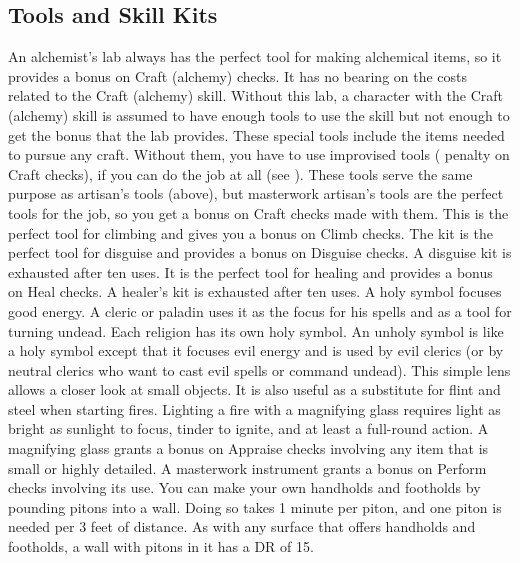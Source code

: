 \subsection{Tools and Skill Kits}
 An alchemist's lab always has the perfect tool for making alchemical items, so it provides a  bonus on Craft (alchemy) checks. It has no bearing on the costs related to the Craft (alchemy) skill. Without this lab, a character with the Craft (alchemy) skill is assumed to have enough tools to use the skill but not enough to get the  bonus that the lab provides.
 These special tools include the items needed to pursue any craft. Without them, you have to use improvised tools ( penalty on Craft checks), if you can do the job at all (see ).
 These tools serve the same purpose as artisan's tools (above), but masterwork artisan's tools are the perfect tools for the job, so you get a  bonus on Craft checks made with them.
 This is the perfect tool for climbing and gives you a  bonus on Climb checks.
 The kit is the perfect tool for disguise and provides a  bonus on Disguise checks. A disguise kit is exhausted after ten uses.
 It is the perfect tool for healing and provides a  bonus on Heal checks. A healer's kit is exhausted after ten uses.
 A holy symbol focuses good energy. A cleric or paladin uses it as the focus for his spells and as a tool for turning undead. Each religion has its own holy symbol.
 An unholy symbol is like a holy symbol except that it focuses evil energy and is used by evil clerics (or by neutral clerics who want to cast evil spells or command undead).
 This simple lens allows a closer look at small objects. It is also useful as a substitute for flint and steel when starting fires. Lighting a fire with a magnifying glass requires light as bright as sunlight to focus, tinder to ignite, and at least a full-round action. A magnifying glass grants a  bonus on Appraise checks
involving any item that is small or highly detailed.
 A masterwork instrument grants a  bonus on Perform checks involving its use.
 You can make your own handholds and footholds by pounding pitons into a wall. Doing so takes 1 minute per piton, and one piton is needed per 3 feet of distance. As with any surface that offers handholds and footholds, a wall with pitons in it has a DR of 15.

